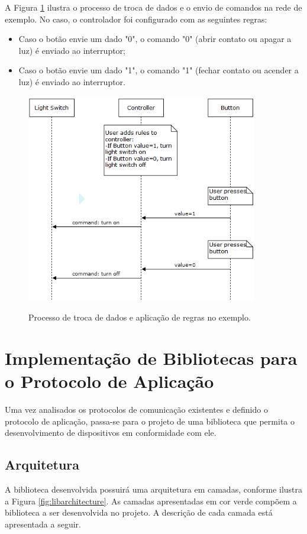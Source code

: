 A Figura \ref{fig:exemplo_dados} ilustra o processo de troca de dados e o envio de comandos na rede de exemplo. No caso, o controlador foi configurado com as seguintes regras:
\begin{itemize}
	\item Caso o botão envie um dado "0", o comando "0" (abrir contato ou apagar a luz) é enviado ao interruptor;
	\item Caso o botão envie um dado "1", o comando "1" (fechar contato ou acender a luz) é enviado ao interruptor.
\end{itemize}

\begin{figure}[hp]
	\centering
	\caption{Processo de troca de dados e aplicação de regras no exemplo.}
	\includegraphics[width=0.9\textwidth]{imagens/exemplo_dados.png}
 	\label{fig:exemplo_dados}
\end{figure}

\clearpage

\section{Implementação de Bibliotecas para o Protocolo de Aplicação} \label{sec:implsens}
Uma vez analisados os protocolos de comunicação existentes e definido o protocolo de aplicação, passa-se para o projeto de uma biblioteca que permita o desenvolvimento de dispositivos em conformidade com ele.

\subsection{Arquitetura}
A biblioteca desenvolvida possuirá uma arquitetura em camadas, conforme ilustra a Figura \ref{fig:libarchitecture}. As camadas apresentadas em cor verde compõem a biblioteca a ser desenvolvida no projeto. A descrição de cada camada está apresentada a seguir.

